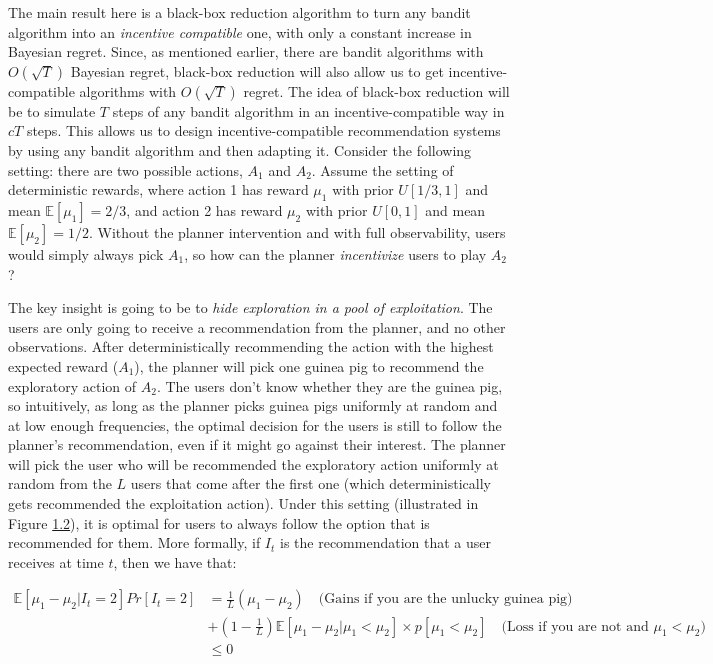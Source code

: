 \documentclass[
  letterpaper,
  numbers=noenddot,
  DIV=11]{scrreprt}
\theoremstyle{definition}
\theoremstyle{plain}
\theoremstyle{plain}
\theoremstyle{remark}
\begin{document}
The main result here is a black-box reduction algorithm to turn any
bandit algorithm into an \emph{incentive compatible} one, with only a
constant increase in Bayesian regret. Since, as mentioned earlier, there
are bandit algorithms with \(O(\sqrt{T})\) Bayesian regret, black-box
reduction will also allow us to get incentive-compatible algorithms with
\(O(\sqrt{T})\) regret. The idea of black-box reduction will be to
simulate \(T\) steps of any bandit algorithm in an incentive-compatible
way in \(c T\) steps. This allows us to design incentive-compatible
recommendation systems by using any bandit algorithm and then adapting
it. Consider the following setting: there are two possible actions,
\(A_1\) and \(A_2\). Assume the setting of deterministic rewards, where
action 1 has reward \(\mu_1\) with prior \(U[1/3, 1]\) and mean
\(\mathbb{E}[\mu_1] = 2/3\), and action 2 has reward \(\mu_2\) with
prior \(U[0, 1]\) and mean \(\mathbb{E}[\mu_2] = 1/2\). Without the
planner intervention and with full observability, users would simply
always pick \(A_1\), so how can the planner \emph{incentivize} users to
play \(A_2\)?

The key insight is going to be to \emph{hide exploration in a pool of
exploitation}. The users are only going to receive a recommendation from
the planner, and no other observations. After deterministically
recommending the action with the highest expected reward (\(A_1\)), the
planner will pick one guinea pig to recommend the exploratory action of
\(A_2\). The users don't know whether they are the guinea pig, so
intuitively, as long as the planner picks guinea pigs uniformly at
random and at low enough frequencies, the optimal decision for the users
is still to follow the planner's recommendation, even if it might go
against their interest. The planner will pick the user who will be
recommended the exploratory action uniformly at random from the \(L\)
users that come after the first one (which deterministically gets
recommended the exploitation action). Under this setting (illustrated in
Figure \hyperref[fig-deterministic-guinea-pig]{1.2}), it is optimal for
users to always follow the option that is recommended for them. More
formally, if \(I_t\) is the recommendation that a user receives at time
\(t\), then we have that:

\[
\begin{split}
    \mathbb{E}[\mu_1 - \mu_2 | I_t = 2] Pr[I_t = 2] &= \frac{1}{L} (\mu_1 - \mu_2) \quad \text{(Gains if you are the unlucky guinea pig)}\\
    &+ (1 - \frac{1}{L}) \mathbb{E}[\mu_1 - \mu_2 | \mu_1 < \mu_2] \times p[\mu_1 < \mu_2] \quad \text{(Loss if you are not and $\mu_1 < \mu_2$)}\\
    &\leq 0
\end{split}
\]
\end{document}
